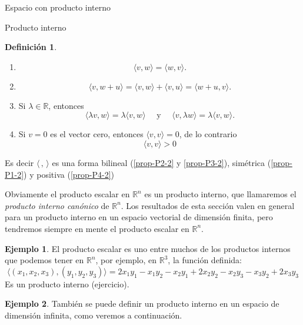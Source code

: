 \documentclass[a4paper,12pt,twoside,spanish]{amsbook}
\theoremstyle{definition}
\newtheorem{definicion}{Definici\'on}[section]
\newtheorem{ejemplo}{Ejemplo}[section]
\theoremstyle{remark}
\newcommand{\la}{\langle}
\newcommand{\ra}{\rangle}
\newcommand{\R}{\mathbb R}
\begin{document}
\begin{chapter}{Espacio con producto interno}
\begin{section}{Producto interno}
\begin{definicion}
			\begin{enumerate}[label=\textbf{P\arabic*.},ref=P\arabic*]
				\item\label{prop-P1-2}
				\begin{equation*}
					\langle v , w \rangle = \langle w , v \rangle.
				\end{equation*} 	
				\item\label{prop-P2-2} 
				\begin{equation*}
				\langle v , w + u \rangle =\langle v , w \rangle + \langle v , u \rangle = \langle w +u , v \rangle.
				\end{equation*}
				\item\label{prop-P3-2}  Si $\lambda \in \R$, entonces 
				\begin{equation*}
				\langle \lambda v , w \rangle = \lambda \langle v , w \rangle \quad \text{ y } \quad  \langle v , \lambda w \rangle = \lambda \langle v , w \rangle.
				\end{equation*}
				\item\label{prop-P4-2} Si $v=0$ es el vector cero, entonces $\langle v , v \rangle =0$,  de lo contrario
				\begin{equation*}
				\langle v , v \rangle >0
				\end{equation*}
			\end{enumerate}
			Es decir  $\la \,,\,\ra$ es una forma bilineal (\ref{prop-P2-2} y \ref{prop-P3-2}),  simétrica (\ref{prop-P1-2}) y positiva (\ref{prop-P4-2})
		\end{definicion}
	
		
		Obviamente el producto escalar en $\R^n$  es un producto interno,  que llamaremos  el  \textit{producto interno canónico} de $\R^n$. Los resultados de esta sección valen en general para un producto interno en un espacio vectorial de dimensión finita, pero tendremos siempre en mente el producto escalar en $\R^n$. 

			\begin{ejemplo} El producto escalar es uno entre  muchos de los productos internos que podemos tener en $\R^n$, por ejemplo,  en $\R^3$,  la función definida:
				\begin{equation*}
					\langle (x_1,x_2,x_3) , (y_1,y_2,y_3)\rangle =2x_1y_1-x_1y_2-x_2y_1+2x_2y_2-x_2y_3-x_3y_2+2x_3y_3
				\end{equation*}
				Es un producto interno (ejercicio).
			\end{ejemplo}
		
		\begin{ejemplo} También  se puede definir un producto interno en un espacio de dimensión infinita, como veremos a continuación.
			

\end{ejemplo}
\end{section}
\end{chapter}
\end{document}
